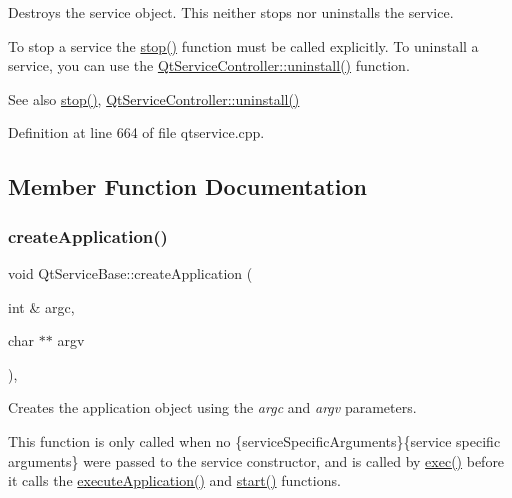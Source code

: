 Destroys the service object. This neither stops nor uninstalls the service.

To stop a service the \mbox{\hyperlink{class_qt_service_base_a8d52c1b8fd06b50bdc0a0c6f9936a68e}{stop()}} function must be called explicitly. To uninstall a service, you can use the \mbox{\hyperlink{class_qt_service_controller_a25cd2f1f6868ece5de77976eb55cb74c}{Qt\+Service\+Controller\+::uninstall()}} function.

\begin{DoxySeeAlso}{See also}
\mbox{\hyperlink{class_qt_service_base_a8d52c1b8fd06b50bdc0a0c6f9936a68e}{stop()}}, \mbox{\hyperlink{class_qt_service_controller_a25cd2f1f6868ece5de77976eb55cb74c}{Qt\+Service\+Controller\+::uninstall()}} 
\end{DoxySeeAlso}


Definition at line 664 of file qtservice.\+cpp.



\subsection{Member Function Documentation}
\mbox{\label{class_qt_service_base_ac5ae73935f489282b35c70b27b341390}} 
\subsubsection{\texorpdfstring{create\+Application()}{createApplication()}}
{\footnotesize\ttfamily void Qt\+Service\+Base\+::create\+Application (\begin{DoxyParamCaption}\item[{int \&}]{argc,  }\item[{char $\ast$$\ast$}]{argv }\end{DoxyParamCaption})\hspace{0.3cm}{\ttfamily [protected]}, {}}

Creates the application object using the {\itshape argc} and {\itshape argv} parameters.

This function is only called when no  \{service\+Specific\+Arguments\}\{service specific arguments\} were passed to the service constructor, and is called by \mbox{\hyperlink{class_qt_service_base_afae2e589de71c1ae3ae8db3dc9ab9c64}{exec()}} before it calls the \mbox{\hyperlink{class_qt_service_base_ab70633cd29a22758dfa0502b77e564f6}{execute\+Application()}} and \mbox{\hyperlink{class_qt_service_base_adbc0cd621b41bd3a6a1f62fda432e9e4}{start()}} functions.

